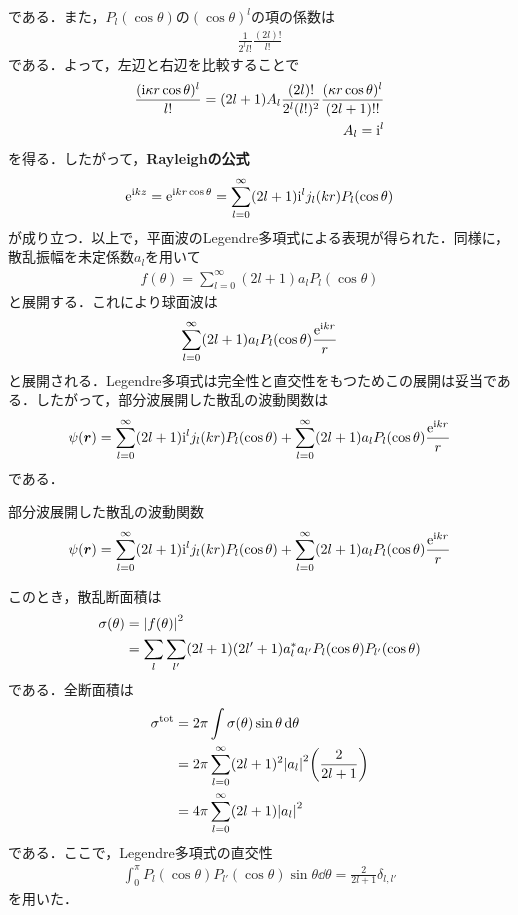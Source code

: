 \documentclass{report}
\begin{document}
  である．また，$P_l(\cos\theta)$の$(\cos\theta)^l$の項の係数は
  \begin{align}
    \frac{1}{2^l l!}\frac{(2l)!}{l!}
  \end{align}
  である．よって，左辺と右辺を比較することで
  \begin{align}
    \frac{(\mathrm{i} \kappa r \cos\theta)^l}{l!} = (2l+1)A_l \frac{(2l)!}{2^l (l!)^2}\frac{(\kappa r \cos\theta)^l}{(2l+1)!!}\\
    A_l = \mathrm{i}^l
  \end{align}
  を得る．したがって，\textbf{Rayleighの公式}
  \begin{align}
    \mathrm{e}^{\mathrm{i} kz} = \mathrm{e}^{\mathrm{i} kr\cos\theta} = \sum_{l=0}^{\infty} (2l+1)\mathrm{i}^l j_l(kr)P_l(\cos\theta)
  \end{align}
  が成り立つ．以上で，平面波のLegendre多項式による表現が得られた．同様に，散乱振幅を未定係数$a_l$を用いて
  \begin{align}
    f(\theta) = \sum_{l=0}^{\infty} (2l+1)a_l P_l(\cos\theta)
  \end{align}
  と展開する．これにより球面波は
  \begin{align}
    \sum_{l=0}^{\infty} (2l+1)a_l P_l(\cos\theta) \frac{\mathrm{e}^{\mathrm{i} kr}}{r}
  \end{align}
  と展開される．Legendre多項式は完全性と直交性をもつためこの展開は妥当である．したがって，部分波展開した散乱の波動関数は
  \begin{align}
    \psi(\bm{r}) = \sum_{l=0}^{\infty} (2l+1)\mathrm{i}^l j_l(kr)P_l(\cos\theta) + \sum_{l=0}^{\infty} (2l+1)a_l P_l(\cos\theta) \frac{\mathrm{e}^{\mathrm{i} kr}}{r}
  \end{align}
  である．
  \begin{itembox}[l]{部分波展開した散乱の波動関数}
  \begin{align}
    \label{PartialWave}
    \psi(\bm{r}) = \sum_{l=0}^{\infty} (2l+1)\mathrm{i}^l j_l(kr)P_l(\cos\theta) + \sum_{l=0}^{\infty} (2l+1)a_l P_l(\cos\theta) \frac{\mathrm{e}^{\mathrm{i} kr}}{r}
  \end{align}
  \end{itembox}
  このとき，散乱断面積は
  \begin{align}
    \sigma(\theta) &= \abs{f(\theta)}^2\\
    &= \sum_{l} \sum_{l'} (2l+1)(2l'+1) a_l^{*}a_{l'} P_l(\cos\theta) P_{l'}(\cos\theta)
  \end{align}
  である．全断面積は
  \begin{align}
    \sigma^{\mathrm{tot}} &= 2\pi \int \sigma(\theta) \sin\theta \dd{\theta}\\
    &= 2\pi \sum_{l=0}^{\infty} (2l+1)^2\abs{a_l}^2\qty(\frac{2}{2l+1})\\
    &= 4\pi \sum_{l=0}^{\infty} (2l+1) \abs{a_l}^2
  \end{align}
  である．ここで，Legendre多項式の直交性
  \begin{align}
    \int_{0}^{\pi} P_l(\cos\theta)P_{l'}(\cos\theta) \sin\theta \dd{\theta} = \frac{2}{2l+1}\delta_{l,l'}
  \end{align}
  を用いた．
\end{document}
